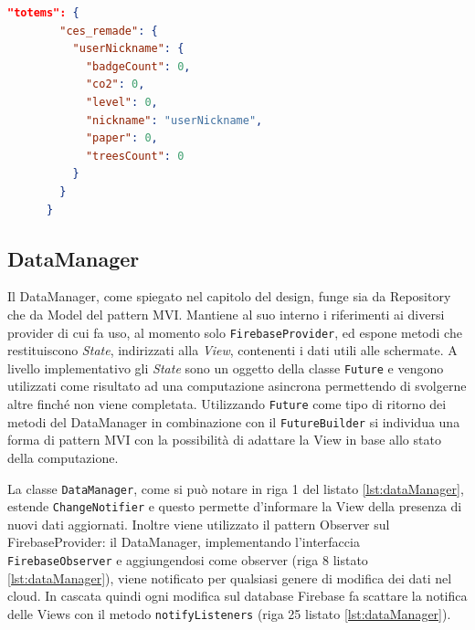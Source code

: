 \begin{lstlisting}[language=json, caption={Esempio di oggetto JSON che memorizza i dati utente per ciascun Totem}, label={lst:userDataTotem}]
      "totems": {
        "ces_remade": {
          "userNickname": {
            "badgeCount": 0,
            "co2": 0,
            "level": 0,
            "nickname": "userNickname",
            "paper": 0,
            "treesCount": 0
          }
        }
      }
\end{lstlisting}

\subsection{DataManager}
Il DataManager, come spiegato nel capitolo del design, funge sia da Repository che da Model del pattern MVI. Mantiene al suo interno i riferimenti ai diversi provider di cui fa uso, al momento solo \texttt{FirebaseProvider}, ed espone metodi che restituiscono \textit{State}, indirizzati alla \textit{View}, contenenti i dati utili alle schermate. A livello implementativo gli \textit{State} sono un oggetto della classe \texttt{Future} e vengono utilizzati come risultato ad una computazione asincrona permettendo di svolgerne altre finché non viene completata. Utilizzando \texttt{Future} come tipo di ritorno dei metodi del DataManager in combinazione con il \texttt{FutureBuilder} si individua una forma di pattern MVI con la possibilità di adattare la View in base allo stato della computazione.

La classe \texttt{DataManager}, come si può notare in riga 1 del listato \ref{lst:dataManager}, estende \texttt{ChangeNotifier} e questo permette d'informare la View della presenza di nuovi dati aggiornati.
Inoltre viene utilizzato il pattern Observer sul FirebaseProvider: il DataManager, implementando l'interfaccia \texttt{FirebaseObserver} e aggiungendosi come observer (riga 8 listato \ref{lst:dataManager}), viene notificato per qualsiasi genere di modifica dei dati nel cloud.
In cascata quindi ogni modifica sul database Firebase fa scattare la notifica delle Views con il metodo \texttt{notifyListeners} (riga 25 listato \ref{lst:dataManager}).

